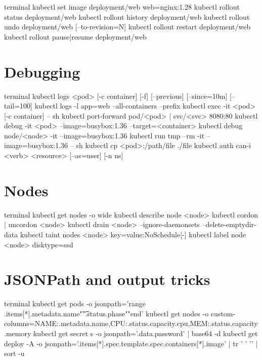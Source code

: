 \begin{bashcode}{terminal}
kubectl set image deployment/web web=nginx:1.28
kubectl rollout status deployment/web
kubectl rollout history deployment/web
kubectl rollout undo deployment/web [--to-revision=N]
kubectl rollout restart deployment/web
kubectl rollout pause|resume deployment/web
\end{bashcode}

\section{Debugging}

\begin{bashcode}{terminal}
kubectl logs <pod> [-c container] [-f] [--previous] [--since=10m] [--tail=100]
kubectl logs -l app=web --all-containers --prefix
kubectl exec -it <pod> [-c container] -- sh
kubectl port-forward pod/<pod> | svc/<svc> 8080:80
kubectl debug -it <pod> --image=busybox:1.36 --target=<container>
kubectl debug node/<node> -it --image=busybox:1.36
kubectl run tmp --rm -it --image=busybox:1.36 -- sh
kubectl cp <pod>:/path/file ./file
kubectl auth can-i <verb> <resource> [--as=user] [-n ns]
\end{bashcode}

\section{Nodes}

\begin{bashcode}{terminal}
kubectl get nodes -o wide
kubectl describe node <node>
kubectl cordon | uncordon <node>
kubectl drain <node> --ignore-daemonsets --delete-emptydir-data
kubectl taint nodes <node> key=value:NoSchedule[-]
kubectl label node <node> disktype=ssd
\end{bashcode}

\section{JSONPath and output tricks}

\begin{bashcode}{terminal}
kubectl get pods -o jsonpath='{range .items[*]}{.metadata.name}{"\t"}{.status.phase}{"\n"}{end}'
kubectl get nodes -o custom-columns=NAME:.metadata.name,CPU:.status.capacity.cpu,MEM:.status.capacity.memory
kubectl get secret s -o jsonpath='{.data.password}' | base64 -d
kubectl get deploy -A -o jsonpath='{.items[*].spec.template.spec.containers[*].image}' | tr ' ' '\n' | sort -u
\end{bashcode}


